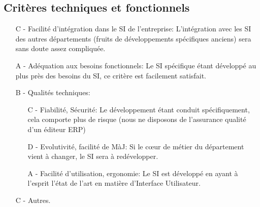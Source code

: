 \subsection{Critères techniques et fonctionnels}

\begin{itemize}
\item[C -] Facilité d'intégration dans le SI de l'entreprise:\el
L'intégration avec les SI des autres départements (fruits de développements
spécifiques anciens) sera sans doute assez compliquée.

\item[A -] Adéquation aux besoins fonctionnels:\el
Le SI spécifique étant développé au plus près des besoins du SI, ce critère
est facilement satisfait.

\item[B -] Qualités techniques:\el
\begin{itemize}

	\item[C -] Fiabilité, Sécurité:\el
Le développement étant conduit spécifiquement, cela comporte plus de risque
(nous ne disposons de l'assurance qualité d'un éditeur ERP)

	\item[D -] Evolutivité, facilité de MàJ:\el
Si le c\oe{}ur de métier du département vient à changer, le SI sera à
redévelopper.

	\item[A -] Facilité d'utilisation, ergonomie:\el
Le SI est développé en ayant à l'esprit l'état de l'art en matière
d'Interface Utilisateur.
\end{itemize}

\item[C -] Autres.
\end{itemize}

